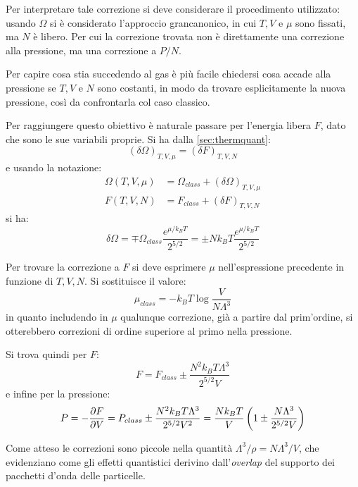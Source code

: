 Per interpretare tale correzione si deve considerare il procedimento utilizzato: usando $\Omega$ si è considerato l'approccio grancanonico, in cui $T,V$ e $\mu$ sono fissati, ma $N$ è libero. Per cui la correzione trovata non è direttamente una correzione alla pressione, ma una correzione a $P/N$.

\noindent Per capire cosa stia succedendo al gas è più facile chiedersi cosa accade alla pressione se $T,V$ e $N$ sono costanti, in modo da trovare esplicitamente la nuova pressione, così da confrontarla col caso classico.

Per raggiungere questo obiettivo è naturale passare per l'energia libera $F$, dato che sono le sue variabili proprie.
Si ha dalla \cref{sec:thermquant}:
\begin{equation*}
(\delta \Omega)_{T, V, \mu} = (\delta F)_{T,V,N}
\end{equation*}
e usando la notazione:
\begin{align*}
\Omega(T,V,\mu) &= \Omega_{class} + (\delta \Omega)_{T, V, \mu}\\
F(T,V,N) &= F_{class} + (\delta F)_{T, V, N}
\end{align*}
si ha:
\begin{equation*}
\delta \Omega = \mp \Omega_{class}\frac{e^{\mu/k_B T}}{2^{5/2}} = \pm N k_B T \frac{e^{\mu/k_B T}}{2^{5/2}}
\end{equation*}

Per trovare la correzione a $F$ si deve esprimere $\mu$ nell'espressione precedente in funzione di $T,V,N$. Si sostituisce il valore:
\begin{equation*}
\mu_{class} = -k_B T \log\frac{V}{N \Lambda^3}
\end{equation*}
in quanto includendo in $\mu$ qualunque correzione, già a partire dal prim'ordine, si otterebbero correzioni di ordine superiore al primo nella pressione.

Si trova quindi per $F$:
\begin{equation*}
F = F_{class} \pm \frac{N^2 k_B T \Lambda^3}{2^{5/2} V}
\end{equation*}
e infine per la pressione:
\begin{equation*}
P = - \frac{\partial {F}}{\partial {V}} = P_{class} \pm \frac{N^2 k_B T \Lambda^3}{2^{5/2} V^2} = \frac{N k_B T}{V} \left(1  \pm \frac{N\Lambda^3}{2^{5/2} V}\right)
\end{equation*}

Come atteso le correzioni sono piccole nella quantità $\Lambda^3 / \rho = N\Lambda^3 / V$, che evidenziano come gli effetti quantistici derivino dall'\textit{overlap} del supporto dei pacchetti d'onda delle particelle.


